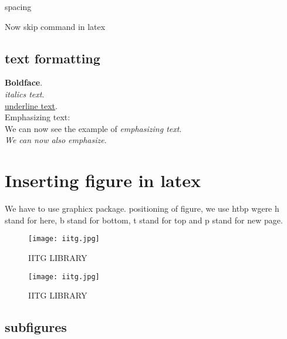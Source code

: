 \documentclass[a4paper, 12pt]{article}
\begin{document}
	spacing
	\newpage
	\blindtext
	\vspace{5cm}
	\blindtext
	
	
	Now skip command in latex
	\blindtext
	
	\smallskip
	
	\newpage
	
	\subsection{text formatting}
	\textbf{Boldface}. \\
	\textit{italics text}. \\
	
	\underline{underline text}. \\
	
	\noindent  Emphasizing text: \\ 
	We can now see the example of  
	\emph{emphasizing text}. \\
	\textit{We can now also
		\emph{emphasize}}.\\
	
	
	{\sffamily \blindtext}  %
	{\scshape \blindtext} %
	\newpage
	\section{Inserting figure in latex}
	We have to use graphicx package.
	positioning of figure, we use htbp wgere h stand for here, b stand for bottom, t stand for top and p stand for new page.
	
	\begin{figure}
		\centering
		\texttt{[image: iitg.jpg]}
		\caption{IITG LIBRARY}
	\end{figure}
	\begin{figure}[h]
		\centering
		\texttt{[image: iitg.jpg]}
		\caption{IITG LIBRARY}
		
	\end{figure}
	
	\subsection{subfigures}
	
\end{document}

